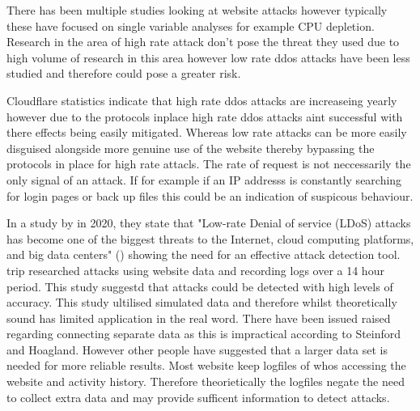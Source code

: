 
There has been multiple studies looking at website attacks however typically these have focused on single variable analyses for example CPU depletion. Research in the area of high rate attack don't pose the threat they used due to high volume of research in this area however low rate ddos attacks have been less studied and therefore could pose a greater risk.

Cloudflare statistics indicate that high rate ddos attacks are increaseing yearly however due to the protocols inplace high rate ddos attacks aint successful with there effects being easily mitigated. Whereas low rate attacks can be more easily disguised alongside more genuine use of the website thereby bypassing the protocols in place for high rate attacls. The rate of request is not neccessarily the only signal of an attack. If for example if an IP addresss is constantly searching for login pages or back up files this could be an indication of suspicous behaviour. 

In a study by \citeauthor{9016229} in 2020, they state that "Low-rate Denial of service (LDoS) attacks has become one of the biggest threats to the Internet, cloud computing platforms, and big data centers" (\cite{9016229}) showing the need for an effective attack detection tool. trip researched attacks using website data and recording logs over a 14 hour period. This study suggestd that attacks could be detected with high levels of accuracy. This study ultilised simulated data and therefore whilst theoretically sound  has limited application in the real word. There have been issued raised regarding connecting separate data as this is impractical according to Steinford and Hoagland. However other people have suggested that a larger data set is needed for more reliable results. Most website keep logfiles of whos accessing the website and activity history. Therefore theorietically the logfiles negate the need to collect extra data and may provide sufficent information to detect attacks. 

